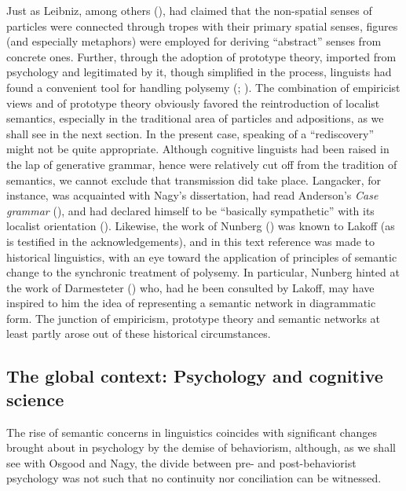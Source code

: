 \documentclass[output=paper]{langscibook}
\begin{document}
Just as Leibniz, among others (\citealt{leibniz_lingua_1923}), had claimed that the non-spatial senses of particles were connected through tropes with their primary spatial senses, figures (and especially metaphors) were employed for deriving “abstract” senses from concrete ones. Further, through the adoption of prototype theory, imported from psychology and legitimated by it, though simplified in the process, linguists had found a convenient tool for handling polysemy (\citealt{kleiber_semantique_1990}; \citealt{arigne_prototype_2018}). The combination of empiricist views and of prototype theory obviously favored the reintroduction of localist semantics, especially in the traditional area of particles and adpositions, as we shall see in the next section. In the present case, speaking of a “rediscovery” might not be quite appropriate. Although cognitive linguists had been raised in the lap of generative grammar, hence were relatively cut off from the tradition of semantics, we cannot exclude that transmission did take place. Langacker, for instance, was acquainted with Nagy’s dissertation, had read Anderson’s \textit{Case grammar} (\citeyear{anderson_grammar_1971}), and had declared himself to be “basically sympathetic” with its localist orientation (\citeyear{anderson_essay_1973}). Likewise, the work of Nunberg (\citeyear{nunberg_pragmatics_1978}) was known to Lakoff (as is testified in the acknowledgements), and in this text reference was made to historical linguistics, with an eye toward the application of principles of semantic change to the synchronic treatment of polysemy. In particular, Nunberg hinted at the work of Darmesteter (\citeyear{darmesteter_vie_1887}) who, had he been consulted by Lakoff, may have inspired to him the idea of representing a semantic network in diagrammatic form. The junction of empiricism, prototype theory and semantic networks at least partly arose out of these historical circumstances.

\subsection{The global context: Psychology and cognitive science}

The rise of semantic concerns in linguistics coincides with significant changes brought about in psychology by the demise of behaviorism, although, as we shall see with Osgood and Nagy, the divide between pre- and post-behaviorist psychology was not such that no continuity nor conciliation can be witnessed.
\end{document}
